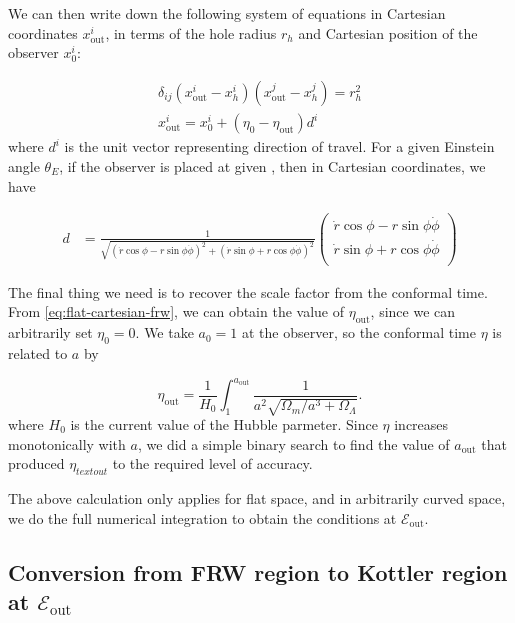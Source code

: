 We can then write down the following system of equations in Cartesian coordinates $x^i_{\text{out}}$, in terms of the hole radius $r_h$ and Cartesian position of the observer $x^i_0$:

\begin{subequations}
  \begin{align}
  \delta_{ij} (x^i_{\text{out}} - x^i_h)(x^j_{\text{out}} - x^j_h) = r_h^2\\
  x^i_{\text{out}} = x^i_0 + (\eta_0 - \eta_{\text{out}})d^i    
  \end{align}
  \label{eq:flat-cartesian-frw}
\end{subequations}
where $d^i$ is the unit vector representing direction of travel. For a given Einstein angle $\theta_E$, if the observer is placed at given , then in Cartesian coordinates, we have 

\begin{align}
    d &= \frac{1}{\sqrt{(\dot{r}\cos\phi - r\sin\phi\dot{\phi})^2 + (\dot{r}\sin\phi + r\cos\phi\dot{\phi})^2}}
          \begin{pmatrix}
           \dot{r}\cos\phi - r\sin\phi\dot{\phi} \\
           \dot{r}\sin\phi + r\cos\phi\dot{\phi} \\
         \end{pmatrix}
\end{align}

The final thing we need is to recover the scale factor from the conformal time. From \autoref{eq:flat-cartesian-frw}, we can obtain the value of $\eta_{\text{out}}$, since we can arbitrarily set $\eta_0 = 0$. We take $a_0 = 1$ at the observer, so the conformal time $\eta$ is related to $a$ by

\begin{equation}
  \eta_{\text{out}} = \frac{1}{H_0} \int_1^{a_{\text{out}}} \frac{1}{a^2 \sqrt{\Omega_m/a^3 + \Omega_{\Lambda}}}.
  \label{eq:conformal-time-eta-to-a-integral}
\end{equation}
where $H_0$ is the current value of the Hubble parmeter. Since $\eta$ increases monotonically with $a$, we did a simple binary search to find the value of $a_{\text{out}}$ that produced $\eta_{text{out}}$ to the required level of accuracy. 

The above calculation only applies for flat space, and in arbitrarily curved space, we do the full numerical integration to obtain the conditions at $\mathcal{E}_{\text{out}}$.

\subsection{Conversion from FRW region to Kottler region at $\mathcal{E}_{\text{out}}$}
\label{subsec:frw-to-kottler}

